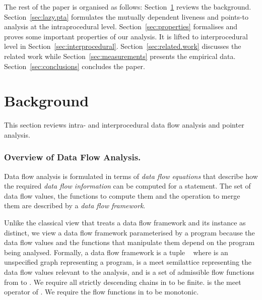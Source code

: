 \documentclass{llncs}
\begin{document}
The rest of the paper is organised as follows:
Section~\ref{sec:background} reviews the background. 
Section~\ref{sec:lazy.pta} formulates the mutually dependent
liveness and points-to analysis at the
intraprocedural level. 
Section~\ref{sec:properties}
formalises and proves some important properties of our analysis.
It is lifted to interprocedural level
in Section~\ref{sec:interprocedural}. 
Section~\ref{sec:related.work} discusses the related work while
Section~\ref{sec:measurements} presents the empirical data.
 Section~\ref{sec:conclusions} concludes the
paper.




\section{Background}
\label{sec:background}

This section reviews intra- and interprocedural data flow analysis
and pointer analysis.


\newcommand{\LD}{\text{{\bfseries\em L}}\xspace}
\newcommand{\FD}{\text{{\bfseries\em F}}\xspace}

\subsubsection{Overview of Data Flow Analysis.}
\label{sec:dff}
Data flow analysis is formulated in terms of {\em data flow equations\/} that
describe how the required {\em data flow information\/} can be computed for a statement.
The set of data flow values, the functions to compute them and the operation
to merge them are described by a {\em data flow framework\/}.

Unlike the classical view that treats a data flow framework and its
instance as distinct\cite{Kildall.GA:1973:unified-approach-to,Kam.JB.Ullman.JD:1977:Monotone-data-flow,Hecht.MS:1977:Flow-Analysis-of,Aho.AV.Lam.MS.Sethi.R.Ullman.JD:2006:Compilers-Principles-Techniques,Nielson.F.Nielson.HR.Hankin.C:1998:Principles-of-Program},
we view a data flow framework parameterised by a program because the
data flow values and the functions that manipulate them depend on the program being 
analysed. Formally, a data flow framework is a tuple 
\text{}~\cite{Khedker.U.Sanyal.A.Karkare.B:2009:Data-Flow-Analysis} 
where  is an unspecified graph representing a program,
\LD is a meet semilattice representing the data flow values relevant to the analysis,
and \FD is a set of admissible flow functions from \LD to \LD. 
We require all strictly descending chains in \LD to be finite.
 is the meet operator of \LD.
We require the flow functions in \FD to be monotonic.
\end{document}
